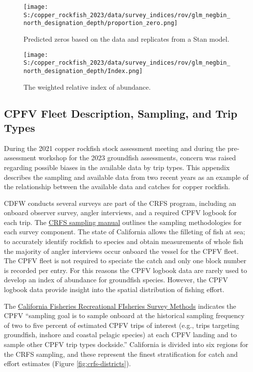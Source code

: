 \documentclass[11pt,
  english,
  letterpaper,
]{article}
\begin{document}
\newpage

\begin{figure}
\centering
\texttt{[image: S:/copper\_rockfish\_2023/data/survey\_indices/rov/glm\_negbin\_north\_designation\_depth/proportion\_zero.png]}
\caption{Predicted zeros based on the data and replicates from a Stan model.\label{fig:rov-prop-zero}}
\end{figure}

\newpage

\begin{figure}
\centering
\texttt{[image: S:/copper\_rockfish\_2023/data/survey\_indices/rov/glm\_negbin\_north\_designation\_depth/Index.png]}
\caption{The weighted relative index of abundance.\label{fig:rov-index}}
\end{figure}

\hypertarget{cpfv-samples}{%
\subsection{CPFV Fleet Description, Sampling, and Trip Types}\label{cpfv-samples}}

During the 2021 copper rockfish stock assessment meeting and during the pre-assessment workshop for the 2023 groundfish assessments, concern was raised regarding possible biases in the available data by trip types. This appendix describes the sampling and available data from two recent years as an example of the relationship between the available data and catches for copper rockfish.

CDFW conducts several surveys are part of the CRFS program, including an onboard observer survey, angler interviews, and a required CPFV logbook for each trip. The \href{https://nrm.dfg.ca.gov/FileHandler.ashx?DocumentID=62348\&inline}{CRFS sampling manual} outlines the sampling methodologies for each survey component. The state of California allows the filleting of fish at sea; to accurately identify rockfish to species and obtain measurements of whole fish the majority of angler interviews occur onboard the vessel for the CPFV fleet. The CPFV fleet is not required to speciate the catch and only one block number is recorded per entry. For this reasons the CPFV logbook data are rarely used to develop an index of abundance for groundfish species. However, the CPFV logbook data provide insight into the spatial distribution of fishing effort.

The \href{https://nrm.dfg.ca.gov/FileHandler.ashx?DocumentID=36136\&inline}{California Fisheries Recreational FIsheries Survey Methods} indicates the CPFV ``sampling goal is to sample onboard at the historical sampling frequency of two to five percent of estimated CPFV trips of interest (e.g., trips targeting groundfish, inshore and coastal pelagic species) at each CPFV landing and to sample other CPFV trip types dockside.'' California is divided into six regions for the CRFS sampling, and these represent the finest stratification for catch and effort estimates (Figure \ref{fig:crfs-districts}).
\end{document}
